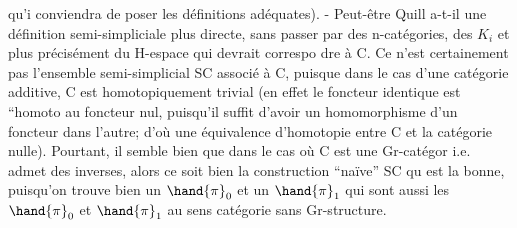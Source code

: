
qu'i conviendra de poser les définitions adéquates). - Peut-être Quill
a-t-il une définition semi-simpliciale plus directe, sans passer par des
n-catégories, des $K_i$ et plus précisément du H-espace qui devrait correspo
dre à C.  Ce n'est certainement pas l'ensemble semi-simplicial
SC  associé à C, puisque dans le cas d'une catégorie additive,
C est homotopiquement trivial (en effet le foncteur identique est ``homoto
au foncteur nul, puisqu'il suffit d'avoir un homomorphisme d'un foncteur
dans l'autre; d'où une équivalence d'homotopie entre C et la catégorie
nulle). Pourtant, il semble bien que dans le cas où C est une Gr-catégor
i.e. admet des inverses, alors ce soit bien la construction ``naïve'' SC qu
est la bonne, puisqu'on trouve bien un $\hand{\pi}_0$ et un $\hand{\pi}_1$ qui sont aussi les
$\hand{\pi}_0$ et $\hand{\pi}_1$ au sens catégorie sans Gr-structure.


